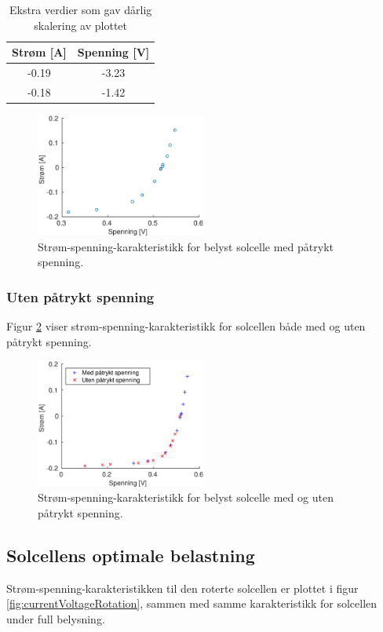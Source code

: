 \documentclass[a4paper,11pt, twocolumn]{article}
\begin{document}
\begin{table}[!ht]
\centering
	\caption{Ekstra verdier som gav dårlig skalering av plottet}
	\label{tab:ekstra}
	\begin{tabular}{cc}
		\toprule
		\toprule
		Strøm [A] & Spenning [V]\\
		\hline
		-0.19 & -3.23\\
		-0.18 & -1.42\\
		\toprule
	\end{tabular}
\end{table}

\begin{figure}[!ht]
	\includegraphics[width = 0.5\textwidth]{matlab/LAB/belystMedSpenning.eps}
	\caption{Strøm-spenning-karakteristikk for belyst solcelle med påtrykt spenning.}
	\label{fig:resMedSpenning}
\end{figure}

\subsubsection{Uten påtrykt spenning}
Figur \ref{fig:resUtenSpenning} viser strøm-spenning-karakteristikk for solcellen både med og uten påtrykt spenning.
\begin{figure}[!ht]
	\includegraphics[width = 0.5\textwidth]{matlab/LAB/utenSpenning.eps}
	\caption{Strøm-spenning-karakteristikk for belyst solcelle med og uten påtrykt spenning.}
	\label{fig:resUtenSpenning}
\end{figure}

\subsection{Solcellens optimale belastning}
Strøm-spenning-karakteristikken til den roterte solcellen er plottet i figur \ref{fig:currentVoltageRotation}, sammen med samme karakteristikk for solcellen under full belysning.
\end{document}
